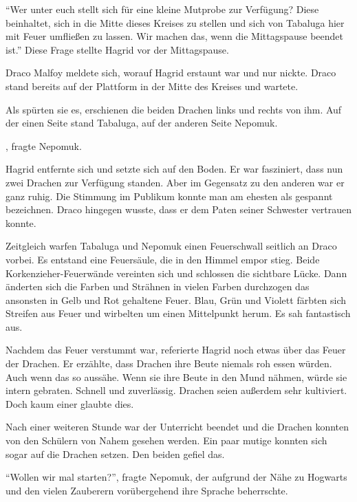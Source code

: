 \enquote{Wer unter euch stellt sich für eine kleine Mutprobe zur Verfügung? Diese beinhaltet, sich in die Mitte dieses Kreises zu stellen und sich von Tabaluga hier mit Feuer umfließen zu lassen. Wir machen das, wenn die Mittagspause beendet ist.} Diese Frage stellte Hagrid vor der Mittagspause.

Draco Malfoy meldete sich, worauf Hagrid erstaunt war und nur nickte. Draco stand bereits auf der Plattform in der Mitte des Kreises und wartete.

Als spürten sie es, erschienen die beiden Drachen links und rechts von ihm. Auf der einen Seite stand Tabaluga, auf der anderen Seite Nepomuk.

, fragte Nepomuk.


Hagrid entfernte sich und setzte sich auf den Boden. Er war fasziniert, dass nun zwei Drachen zur Verfügung standen. Aber im Gegensatz zu den anderen war er ganz ruhig. Die Stimmung im Publikum konnte man am ehesten als gespannt bezeichnen. Draco hingegen wusste, dass er dem Paten seiner Schwester vertrauen konnte.

Zeitgleich warfen Tabaluga und Nepomuk einen Feuerschwall seitlich an Draco vorbei. Es entstand eine Feuersäule, die in den Himmel empor stieg. Beide Korkenzieher-Feuerwände vereinten sich und schlossen die sichtbare Lücke. Dann änderten sich die Farben und Strähnen in vielen Farben durchzogen das ansonsten in Gelb und Rot gehaltene Feuer. Blau, Grün und Violett färbten sich Streifen aus Feuer und wirbelten um einen Mittelpunkt herum. Es sah fantastisch aus.

Nachdem das Feuer verstummt war, referierte Hagrid noch etwas über das Feuer der Drachen. Er erzählte, dass Drachen ihre Beute niemals roh essen würden. Auch wenn das so aussähe. Wenn sie ihre Beute in den Mund nähmen, würde sie intern gebraten. Schnell und zuverlässig. Drachen seien außerdem sehr kultiviert. Doch kaum einer glaubte dies.

Nach einer weiteren Stunde war der Unterricht beendet und die Drachen konnten von den Schülern von Nahem gesehen werden. Ein paar mutige konnten sich sogar auf die Drachen setzen. Den beiden gefiel das.

\enquote{Wollen wir mal starten?}, fragte Nepomuk, der aufgrund der Nähe zu Hogwarts und den vielen Zauberern vorübergehend ihre Sprache beherrschte.

